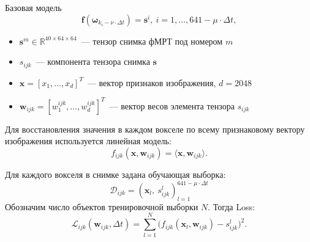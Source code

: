 \documentclass[9pt,pdf]{beamer} %
\begin{document}
\begin{frame}{Базовая модель}
\begin{equation}
	\label{basic_model}
	\bm{f}(\bm{\omega}_{k_i - \nu \cdot \Delta t}) = \bm{s}^i, \ i = 1, \ldots, 641-\mu \cdot \Delta t,
\end{equation}
\begin{itemize}
    \item $\bm{s}^m \in \mathbb{R}^{40 \times 64 \times 64}$~--- тензор снимка фМРТ под номером $m$
    \item $s_{ijk}$~--- компонента тензора снимка $\bm{s}$
    \item $\bm{x} = [x_1, \ldots, x_{d}]^{T}$~--- вектор признаков изображения, $d=2048$ 
    \item $\bm{w}_{ijk} = [w^{ijk}_1, \ldots, w^{ijk}_{d}]^{T}$~--- вектор весов элемента тензора $s_{ijk}$
\end{itemize}
Для восстановления значения в каждом вокселе по всему признаковому вектору изображения используется линейная модель:
\begin{equation}
	\label{f_ijk}
	f_{ijk}(\bm{x}, \bm{w}_{ijk}) = \langle \bm{x}, \bm{w}_{ijk} \rangle.
\end{equation}

Для каждого вокселя в снимке задана обучающая выборка:
\begin{equation}
    \mathcal{D}_{ijk} = \left(\bm{x}_l,~s^{l}_{ijk} \right)^{641 - \mu \cdot \Delta t}_{l = 1}
\end{equation}
Обозначим число объектов тренировочной выборки $N$. Тогда Loss:
\begin{equation}
	\label{Loss}
	\mathcal{L}_{ijk}(\bm{w}_{ijk}, \Delta t) = \sum\limits_{l = 1}^{N} \big(f_{ijk}(\bm{x}_l, \bm{w}_{ijk}) - s^{l}_{ijk}\big)^2.
\end{equation}
\end{frame}
\end{document}
